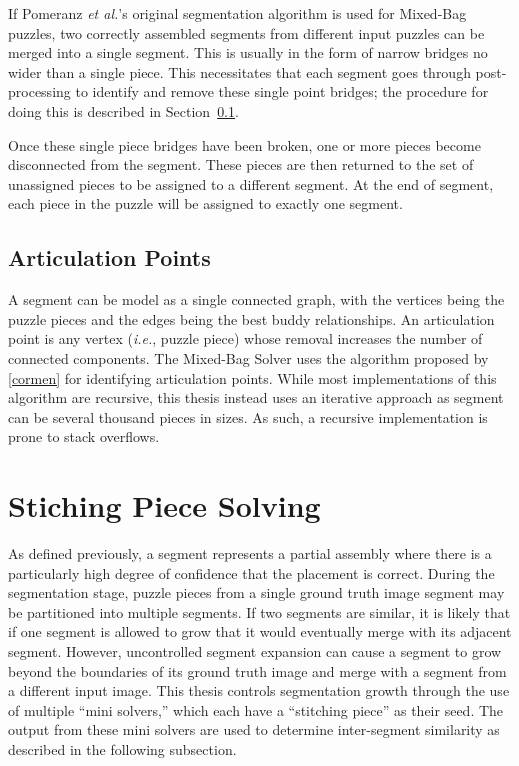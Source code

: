If Pomeranz \textit{et al.}'s original segmentation algorithm is used for Mixed-Bag puzzles, two correctly assembled segments from different input puzzles can be merged into a single segment.  This is usually in the form of narrow bridges no wider than a single piece. This necessitates that each segment goes through post-processing to identify and remove these single point bridges; the procedure for doing this is described in Section~\ref{sec:ArticulationPoints}.  

Once these single piece bridges have been broken, one or more pieces become disconnected from the segment.  These pieces are then returned to the set of unassigned pieces to be assigned to a different segment.  At the end of segment, each piece in the puzzle will be assigned to exactly one segment.

\subsection{Articulation Points}\label{sec:ArticulationPoints}

A segment can be model as a single connected graph, with the vertices being the puzzle pieces and the edges being the best buddy relationships.  An articulation point is any vertex (\textit{i.e.}, puzzle piece) whose removal increases the number of connected components.  The Mixed-Bag Solver uses the algorithm proposed by \ref{cormen} for identifying articulation points.  While most implementations of this algorithm are recursive, this thesis instead uses an iterative approach as segment can be several thousand pieces in sizes.  As such, a recursive implementation is prone to stack overflows.

\section{Stiching Piece Solving}\label{sec:stitchingPieceSolving}

As defined previously, a segment represents a partial assembly where there is a particularly high degree of confidence that the placement is correct. During the segmentation stage, puzzle pieces from a single ground truth image segment may be partitioned into multiple segments. If two segments are similar, it is likely that if one segment is allowed to grow that it would eventually merge with its adjacent segment.  However, uncontrolled segment expansion can cause a segment to grow beyond the boundaries of its ground truth image and merge with a segment from a different input image.  This thesis controls segmentation growth through the use of multiple ``mini solvers,'' which each have a ``stitching piece'' as their seed.  The output from these mini solvers are used to determine inter-segment similarity as described in the following subsection.

